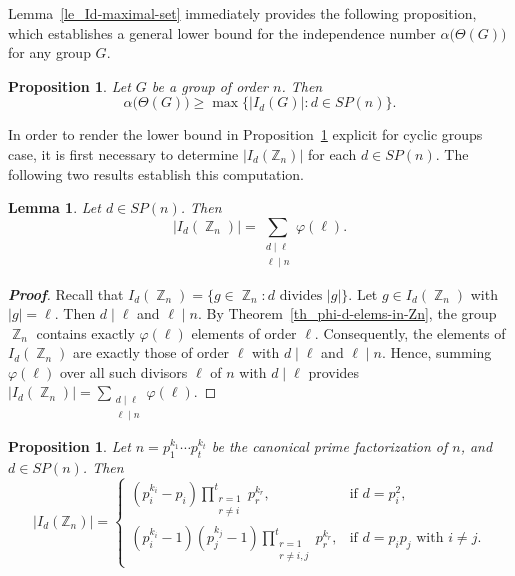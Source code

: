 \documentclass{amsart}
\theoremstyle{plain}
\newtheorem{lemma}[theorem]{Lemma}
\newtheorem{proposition}[theorem]{Proposition}
\theoremstyle{definition}
\DeclareMathOperator{\Z}{\mathbb{Z}}
\begin{document}


Lemma~\ref{le_Id-maximal-set} immediately provides the following proposition, which establishes a general lower bound for the independence number $\alpha\bigl(\Theta(G)\bigr)$ for any group $G$.


\begin{proposition}\label{pr_lower-bound-for-ind-num}
Let $G$ be a group of order $n$. Then 
	\[\alpha\bigl(\Theta(G)\bigr) \geq \max\bigl\{|I_d(G)|\colon d\in SP(n)\bigr\}.\]
\end{proposition}


In order to render the lower bound in Proposition~\ref{pr_lower-bound-for-ind-num} explicit for cyclic groups case, it is first necessary to determine $|I_d(\mathbb{Z}_{n})|$ for each $d \in SP(n)$. The following two results establish this computation.

\begin{lemma}\label{le_card-of-I_d}
Let $d\in SP(n)$. Then  
\[|I_{d}(\Z_{n})| = \sum_{\substack{d\mid \ell\\ \ell\mid n}}\varphi(\ell).\] 
\end{lemma}

\begin{proof}[\textbf{Proof}]
Recall that $I_{d}(\Z_{n})=\bigl\{g\in \Z_{n}\colon d \text{ divides } |g|\bigr\}$. 
Let $g\in I_{d}(\Z_{n})$ with $|g| = \ell$. Then $d\mid \ell$ and $\ell\mid n$. By Theorem~\ref{th_phi-d-elems-in-Zn}, the group $\Z_{n}$ contains exactly $\varphi(\ell)$ elements of order $\ell$. Consequently, the elements of $I_{d}(\Z_{n})$ are exactly those of order $\ell$ with $d\mid \ell$ and $\ell\mid n$. Hence, summing $\varphi(\ell)$ over all such divisors $\ell$ of $n$ with $d\mid \ell$ provides
$|I_{d}(\Z_{n})| = \sum_{\substack{d\mid \ell\\ \ell\mid n}}\varphi(\ell)$.
\end{proof}


\begin{proposition}\label{pr_explicit-formula-size-Id}
Let $n= p_1^{k_1}\cdots p_t^{k_t}$ be the canonical prime factorization of $n$, and $d\in SP(n)$. Then 
\[
|I_d(\mathbb{Z}_n)| =
\begin{cases}
	(p_i^{k_i} - p_i)\displaystyle\prod_{\substack{r=1 \\ r\neq i}}^{t} p_r^{k_r}, & \text{if $d = p_i^2$}, \\[0.5em]
	(p_i^{k_i} - 1)(p_j^{k_j} - 1)\displaystyle\prod_{\substack{r=1 \\ r\neq i,j}}^{t} p_r^{k_r}, & \text{if $d = p_i p_j$ with $i \neq j$}.
\end{cases}\]
\end{proposition}
\end{document}
